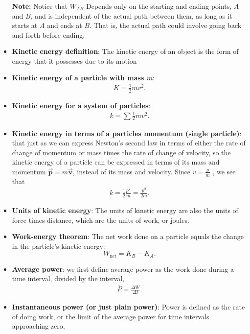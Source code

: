 \documentclass{report}
\begin{document}
\begin{itemize}
     \textbf{Note:} Notice that $W_{AB}$ Depends only on the starting and ending points, $A$ and $B$, and is independent of the actual path between them, as long as it starts at $A$ and ends at $B$. That is, the actual path could involve going back and forth before ending.
    \item \textbf{Kinetic energy definition}: The kinetic energy of an object is the form of energy that it possesses due to its motion
 \item \textbf{Kinetic energy of a particle with mass $m$}:
     \begin{align*}
            K = \frac{1}{2}mv^{2}         
     .\end{align*}
  \item \textbf{Kinetic energy for a system of particles}:
      \begin{align*}
          k = \sum\frac{1}{2}mv^{2}
      .\end{align*}
    \item \textbf{Kinetic energy in terms of a particles momentum (single particle)}:
        that just as we can express Newton’s second law in terms of either the rate of change of momentum or mass times the rate of change of velocity, so the kinetic energy of a particle can be expressed in terms of its mass and momentum  $\vec{\mathbf{p}} = m\vec{\mathbf{v}}$, instead of its mass and velocity. Since $v=\frac{p}{m}$ , we see that
        \begin{align*}
            k = \frac{1}{2}\frac{p^{2}}{m} = \frac{p^{2}}{2m}
        .\end{align*}
    \item \textbf{Units of kinetic energy}: The units of kinetic energy are also the units of force times distance, which are the units of work, or joules.
    \item \textbf{Work-energy theorem}:
        The net work done on a particle equals the change in the particle's kinetic energy:
        \begin{equation}
            W_{\text{net}} = K_B - K_A.
        \end{equation}
    \item \textbf{Average power}: we first define average power as the work done during a time interval, divided by the interval,
        \begin{align*}
            \bar{P} = \frac{\Delta W}{\Delta t}
        .\end{align*}
    \item \textbf{Instantaneous power (or just plain power)}: Power is defined as the rate of doing work, or the limit of the average power for time intervals approaching zero,

\end{itemize}
\end{document}
